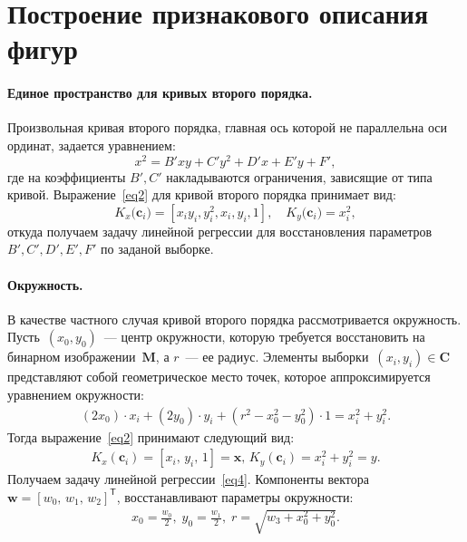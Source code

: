 \documentclass[12pt]{a&t}
\begin{document}
\section{Построение признакового описания фигур}
\paragraph{Единое пространство для кривых второго порядка.} Произвольная кривая второго порядка, главная ось которой не параллельна оси ординат, задается  уравнением:
\[
\label{st:coef}
x^2 = B'xy+C'y^2+D'x+E'y+F',
\]
где на коэффициенты $B', C'$ накладываются ограничения, зависящие от типа кривой. Выражение~\eqref{eq2} для кривой второго порядка принимает вид:
\[
\label{st:K_map}
K_x\bigr(\mathbf{c}_i\bigr)=\left[x_iy_i, y_i^2, x_i, y_i, 1\right], \quad K_y\bigr(\mathbf{c}_i\bigr)=x_i^2,
\]
откуда получаем задачу линейной регрессии для восстановления параметров ~$B', C', D', E', F'$ по заданой выборке.

\paragraph{Окружность.} В качестве частного случая кривой второго порядка рассмотривается окружность.
Пусть~$(x_0, y_0)$~--- центр окружности, которую требуется восстановить на бинарном изображении~$\mathbf{M}$, а $r$~--- ее радиус.
Элементы выборки~$(x_i, y_i) \in \mathbf{C}$ представляют собой геометрическое место точек, которое аппроксимируется уравнением окружности:
\begin{gather}(2x_0)\cdot x_i + (2y_0)\cdot y_i + (r^2 - x_0^2 - y_0^2)\cdot 1 = x_i^2 + y_i^2. 
\end{gather}
Тогда выражение~\eqref{eq2} принимают следующий вид:
\begin{gather}
\label{10}
K_{x}(\mathbf{c}_i) = [x_i, \, y_i, \, 1] = \mathbf{x}, \,  K_{y}(\mathbf{c}_i) = x_i^2+y_i^2 = y.
\end{gather} 
Получаем задачу линейной регрессии~\eqref{eq4}.
Компоненты вектора~$\mathbf{w} = [w_0, \, w_1, \, w_2]^\mathsf{T}$, восстанавливают параметры окружности:
\begin{gather}
x_0 = \frac{w_0}{2}, \; y_0 = \frac{w_1}{2}, \; r = \sqrt{w_3 + x_0^2 + y_0 ^2}.
\end{gather}
\end{document}
